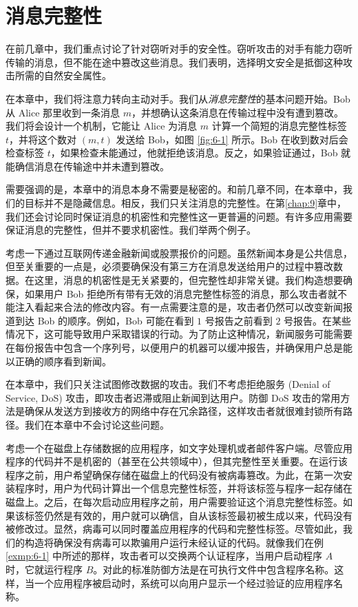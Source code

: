 \chapter{消息完整性}\label{chap:6}

在前几章中，我们重点讨论了针对窃听对手的安全性。窃听攻击的对手有能力窃听传输的消息，但不能在途中篡改这些消息。我们表明，选择明文安全是抵御这种攻击所需的自然安全属性。

在本章中，我们将注意力转向主动对手。我们从\emph{消息完整性}的基本问题开始。Bob 从 Alice 那里收到一条消息 $m$，并想确认这条消息在传输过程中没有遭到篡改。我们将会设计一个机制，它能让 Alice 为消息 $m$ 计算一个简短的消息完整性标签 $t$，并将这个数对 $(m,t)$ 发送给 Bob，如图 \ref{fig:6-1} 所示。Bob 在收到数对后会检查标签 $t$，如果检查未能通过，他就拒绝该消息。反之，如果验证通过，Bob 就能确信消息在传输途中并未遭到篡改。

需要强调的是，本章中的消息本身不需要是秘密的。和前几章不同，在本章中，我们的目标并不是隐藏信息。相反，我们只关注消息的完整性。在第\ref{chap:9}章中，我们还会讨论同时保证消息的机密性和完整性这一更普遍的问题。有许多应用需要保证消息的完整性，但并不要求机密性。我们举两个例子。

\begin{example}\label{exmp:6-1}
考虑一下通过互联网传递金融新闻或股票报价的问题。虽然新闻本身是公共信息，但至关重要的一点是，必须要确保没有第三方在消息发送给用户的过程中篡改数据。在这里，消息的机密性是无关紧要的，但完整性却非常关键。我们构造想要确保，如果用户 Bob 拒绝所有带有无效的消息完整性标签的消息，那么攻击者就不能注入看起来合法的修改内容。有一点需要注意的是，攻击者仍然可以改变新闻报道到达 Bob 的顺序。例如，Bob 可能在看到 $1$ 号报告之前看到 $2$ 号报告。在某些情况下，这可能导致用户采取错误的行动。为了防止这种情况，新闻服务可能需要在每份报告中包含一个序列号，以便用户的机器可以缓冲报告，并确保用户总是能以正确的顺序看到新闻。
\end{example}

在本章中，我们只关注试图修改数据的攻击。我们不考虑拒绝服务 (Denial of Service, DoS) 攻击，即攻击者迟滞或阻止新闻到达用户。防御 DoS 攻击的常用方法是确保从发送方到接收方的网络中存在冗余路径，这样攻击者就很难封锁所有路径。我们在本章中不会讨论这些问题。

\begin{example}\label{exmp:6-2}
考虑一个在磁盘上存储数据的应用程序，如文字处理机或者邮件客户端。尽管应用程序的代码并不是机密的（甚至在公共领域中），但其完整性至关重要。在运行该程序之前，用户希望确保存储在磁盘上的代码没有被病毒篡改。为此，在第一次安装程序时，用户为代码计算出一个信息完整性标签，并将该标签与程序一起存储在磁盘上。之后，在每次启动应用程序之前，用户需要验证这个消息完整性标签。如果该标签仍然是有效的，用户就可以确信，自从该标签最初被生成以来，代码没有被修改过。显然，病毒可以同时覆盖应用程序的代码和完整性标签。尽管如此，我们的构造将确保没有病毒可以欺骗用户运行未经认证的代码。就像我们在例 \ref{exmp:6-1} 中所述的那样，攻击者可以交换两个认证程序，当用户启动程序 $A$ 时，它就运行程序 $B$。对此的标准防御方法是在可执行文件中包含程序名称。这样，当一个应用程序被启动时，系统可以向用户显示一个经过验证的应用程序名称。
\end{example}

